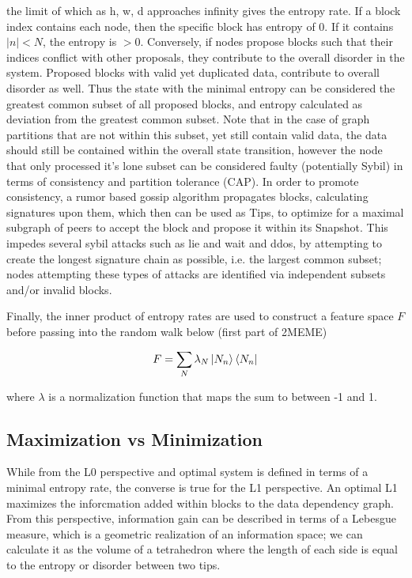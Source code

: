 \documentclass{article}
\begin{document}
	the limit of which as h, w, d approaches infinity gives the entropy rate.
If a block index contains each node, then the specific block has entropy of 0. If it contains $|n| < N$, the entropy is $> 0$. Conversely, if nodes propose blocks such that their indices conflict with other proposals, they contribute to the overall disorder in the system. Proposed blocks with valid yet duplicated data, contribute to overall disorder as well. Thus the state with the minimal entropy can be considered the greatest common subset of all proposed blocks, and entropy calculated as deviation from the greatest common subset. Note that in the case of graph partitions that are not within this subset, yet still contain valid data, the data should still be contained within the overall state transition, however the node that only processed it’s lone subset can be considered faulty (potentially Sybil) in terms of consistency and partition tolerance (CAP). In order to promote consistency, a rumor based gossip algorithm propagates blocks, calculating signatures upon them, which then can be used as Tips, to optimize for a maximal subgraph of peers to accept the block and propose it within its Snapshot. This impedes several sybil attacks such as lie and wait and ddos, by attempting to create the longest signature chain as possible, i.e. the largest common subset; nodes attempting these types of attacks are identified via independent subsets and/or invalid blocks.

Finally, the inner product of entropy rates are used to construct a feature space $F$ before passing into the random walk below (first part of 2MEME)

\begin{equation}
F = \sum_N \lambda_N \ket{N_n} \bra{N_n}
\end{equation}

where $\lambda$ is a normalization function that maps the sum to between -1 and 1.

\subsection{Maximization vs Minimization}
While from the L0 perspective and optimal system is defined in terms of a minimal entropy rate, the converse is true for the L1 perspective. An optimal L1 maximizes the inforcmation added within blocks to the data dependency graph. From this perspective, information gain can be described in terms of a Lebesgue measure, which is a geometric realization of an information space; we can calculate it as the volume of a tetrahedron where the length of each side is equal to the entropy or disorder between two tips. 
\end{document}
